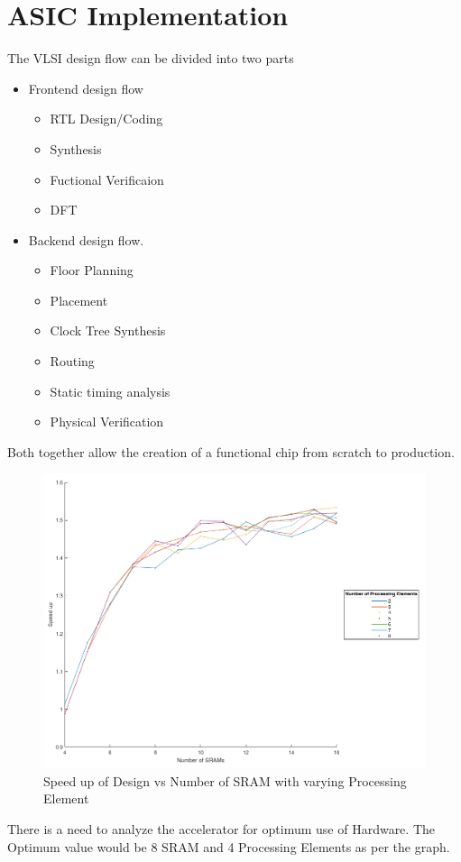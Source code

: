 \chapter{ASIC Implementation}

The VLSI design flow can be divided into two parts
\begin{itemize}
  \itemsep0em 
\item Frontend design flow
    \begin{itemize}
      \itemsep0em 
    \item RTL Design/Coding
	\item Synthesis
	\item Fuctional Verificaion
	\item DFT
    \end{itemize}
\item Backend design flow.
    \begin{itemize}
    \itemsep0em 
    \item Floor Planning
	\item Placement
	\item Clock Tree Synthesis
	\item Routing
	\item Static timing analysis 
	\item Physical Verification
    \end{itemize}
\end{itemize}
Both together allow the creation of a functional chip from scratch to production.

\begin{figure}
  \centering
  \includegraphics[width=0.5\linewidth]{./ASIC/SRAMvsSpeedup.png}
  \caption{Speed up of Design vs Number of SRAM with varying Processing Element}
\end{figure}

There is a need to analyze the accelerator for optimum use of Hardware. The Optimum value would be 8 SRAM and 4 Processing Elements as per the graph.

